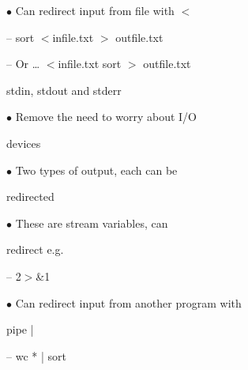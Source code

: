 \documentclass[a4paper,portrait,12pt]{article}
\begin{document}
\begin{flushleft}
$\bullet$ Can redirect input from file with $<$
\end{flushleft}


\begin{flushleft}
-- sort $<$infile.txt $>$ outfile.txt
\end{flushleft}


\begin{flushleft}
-- Or \ldots{} $<$infile.txt sort $>$ outfile.txt
\end{flushleft}





\begin{flushleft}
\newpage
stdin, stdout and stderr
\end{flushleft}


\begin{flushleft}
$\bullet$ Remove the need to worry about I/O
\end{flushleft}


\begin{flushleft}
devices
\end{flushleft}


\begin{flushleft}
$\bullet$ Two types of output, each can be
\end{flushleft}


\begin{flushleft}
redirected
\end{flushleft}


\begin{flushleft}
$\bullet$ These are stream variables, can
\end{flushleft}


\begin{flushleft}
redirect e.g.
\end{flushleft}


-- 2$>$\&1





\begin{flushleft}
\newpage
$\bullet$ Can redirect input from another program with
\end{flushleft}


\begin{flushleft}
pipe |
\end{flushleft}


\begin{flushleft}
-- wc * | sort
\end{flushleft}
\end{document}
